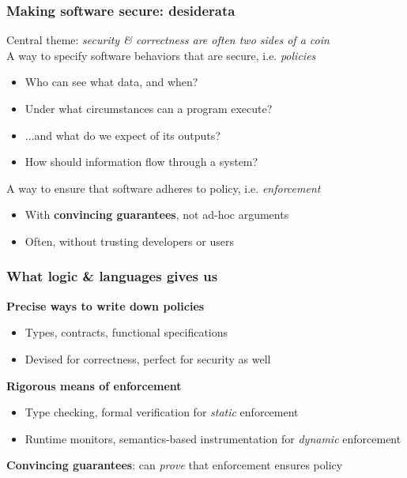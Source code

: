 \documentclass[10pt,handout]{beamer}
\begin{document}
\begin{frame}

\frametitle{Making software secure: desiderata}

Central theme: \emph{security \& correctness are often two sides of a coin}
\\[1em]

\pause
A way to specify software behaviors that are secure, i.e. \emph{policies} \pause
\begin{itemize}
  \item Who can see what data, and when?
  \item Under what circumstances can a program execute?
  \item ...and what do we expect of its outputs?
  \item How should information flow through a system? \\[1em]
\end{itemize}

\pause
A way to ensure that software adheres to policy, i.e. \emph{enforcement} \pause
\begin{itemize}
  \item With \textbf{convincing guarantees}, not ad-hoc arguments
  \item Often, without trusting developers or users
\end{itemize}

\end{frame}


\begin{frame}

\frametitle{What logic \& languages gives us}

\textbf{Precise ways to write down policies} \pause
\begin{itemize}
  \item Types, contracts, functional specifications
  \item Devised for correctness, perfect for security as well \\[1em]
\end{itemize}

\pause
\textbf{Rigorous means of enforcement}
\begin{itemize}
  \item Type checking, formal verification for \emph{static} enforcement
  \item Runtime monitors, semantics-based instrumentation for \emph{dynamic} enforcement \\[1em]
\end{itemize}

\pause
\textbf{Convincing guarantees}: can \emph{prove} that enforcement ensures policy

\end{frame}
\end{document}
